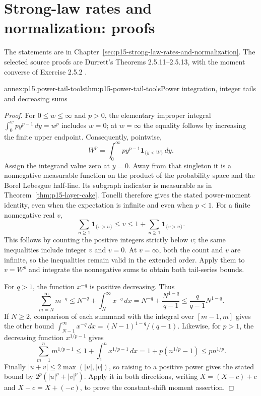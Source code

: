 \section{Strong-law rates and normalization: proofs}
\label{sec:annex-p15-strong-law-rates-and-normalization}

The statements are in Chapter~\ref{sec:p15-strong-law-rates-and-normalization}.
The selected source proofs are Durrett's Theorems 2.5.11--2.5.13,
with the moment converse of Exercise 2.5.2
\cite[pp.~87--90]{DurrettPTEAuthor2019}.

\begin{annexitem}{annex:p15.power-tail-tools}{thm:p15-power-tail-tools}{Power integration, integer tails and decreasing sums}
\begin{proof}
For \(0\leq w\leq\infty\) and \(p>0\), the elementary improper integral
\(\int_0^w p y^{p-1}\,dy=w^p\) includes \(w=0\); at \(w=\infty\)
the equality follows by increasing the finite upper endpoint.
Consequently, pointwise,
\[
 W^p=\int_0^\infty p y^{p-1}\mathbf1_{\{y<W\}}\,dy.
\]
Assign the integrand value zero at \(y=0\). Away from that singleton
it is a nonnegative measurable function on the product of the
probability space and the Borel Lebesgue half-line. Its subgraph
indicator is measurable as in Theorem~\ref{thm:p15-layer-cake}.
Tonelli therefore gives the stated power-moment identity, even
when the expectation is infinite and even when \(p<1\).
For a finite nonnegative real \(v\),
\[
 \sum_{n\geq1}\mathbf1_{\{v>n\}}
       \leq v\leq1+\sum_{n\geq1}\mathbf1_{\{v>n\}}.
\]
This follows by counting the positive integers strictly below \(v\);
the same inequalities include integer \(v\) and \(v=0\).
At \(v=\infty\), both the count and \(v\) are infinite, so the
inequalities remain valid in the extended order.
Apply them to \(v=W^p\) and integrate the nonnegative sums to
obtain both tail-series bounds.

For \(q>1\), the function \(x^{-q}\) is positive decreasing.
Thus
\[
 \sum_{m=N}^\infty m^{-q}
  \leq N^{-q}+\int_N^\infty x^{-q}\,dx
  =N^{-q}+\frac{N^{1-q}}{q-1}
  \leq\frac{q}{q-1}N^{1-q}.
\]
If \(N\geq2\), comparison of each summand with the integral over
\([m-1,m]\) gives the other bound
\(\int_{N-1}^\infty x^{-q}\,dx=(N-1)^{1-q}/(q-1)\).
Likewise, for \(p>1\), the decreasing function \(x^{1/p-1}\)
gives
\[
 \sum_{m=1}^n m^{1/p-1}
 \leq1+\int_1^n x^{1/p-1}\,dx
 =1+p(n^{1/p}-1)\leq p n^{1/p}.
\]
Finally \(|u+v|\leq2\max(|u|,|v|)\), so raising to a positive
power gives the stated bound by \(2^p(|u|^p+|v|^p)\).
Apply it in both directions, writing \(X=(X-c)+c\) and
\(X-c=X+(-c)\), to prove the constant-shift moment assertion.
\end{proof}
\end{annexitem}

